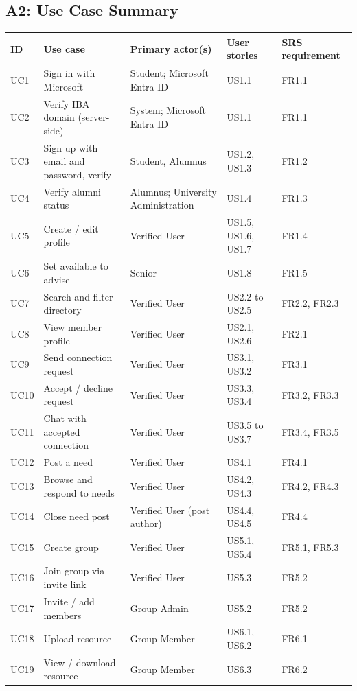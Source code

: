 \documentclass[10pt,a4paper]{article}
\begin{document}
\subsection*{A2: Use Case Summary}
{\small
\begin{longtable}{@{}l >{\raggedright\arraybackslash}p{52mm} >{\raggedright\arraybackslash}p{38mm} l l@{}}
\toprule
\textbf{ID} & \textbf{Use case} & \textbf{Primary actor(s)} & \textbf{User stories} & \textbf{SRS requirement}\\\midrule\endhead
UC1 & Sign in with Microsoft & Student; Microsoft Entra ID & US1.1 & FR1.1\\
UC2 & Verify IBA domain (server-side) & System; Microsoft Entra ID & US1.1 & FR1.1\\
UC3 & Sign up with email and password, verify & Student, Alumnus & US1.2, US1.3 & FR1.2\\
UC4 & Verify alumni status & Alumnus; University Administration & US1.4 & FR1.3\\
UC5 & Create / edit profile & Verified User & US1.5, US1.6, US1.7 & FR1.4\\
UC6 & Set available to advise & Senior & US1.8 & FR1.5\\
UC7 & Search and filter directory & Verified User & US2.2 to US2.5 & FR2.2, FR2.3\\
UC8 & View member profile & Verified User & US2.1, US2.6 & FR2.1\\
UC9 & Send connection request & Verified User & US3.1, US3.2 & FR3.1\\
UC10 & Accept / decline request & Verified User & US3.3, US3.4 & FR3.2, FR3.3\\
UC11 & Chat with accepted connection & Verified User & US3.5 to US3.7 & FR3.4, FR3.5\\
UC12 & Post a need & Verified User & US4.1 & FR4.1\\
UC13 & Browse and respond to needs & Verified User & US4.2, US4.3 & FR4.2, FR4.3\\
UC14 & Close need post & Verified User (post author) & US4.4, US4.5 & FR4.4\\
UC15 & Create group & Verified User & US5.1, US5.4 & FR5.1, FR5.3\\
UC16 & Join group via invite link & Verified User & US5.3 & FR5.2\\
UC17 & Invite / add members & Group Admin & US5.2 & FR5.2\\
UC18 & Upload resource & Group Member & US6.1, US6.2 & FR6.1\\
UC19 & View / download resource & Group Member & US6.3 & FR6.2\\

\end{longtable}}
\end{document}
